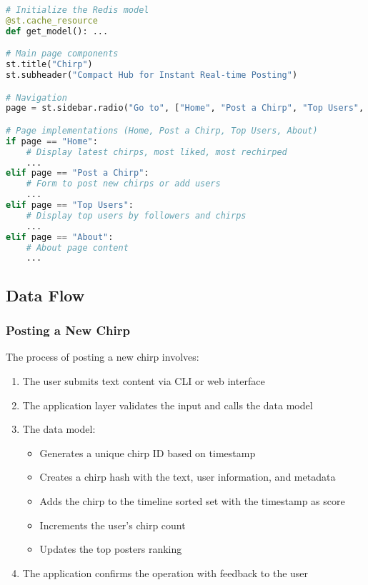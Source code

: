 \documentclass[a4paper,11pt]{article}
\begin{document}
\begin{lstlisting}[language=Python, caption=Streamlit app structure]
# Initialize the Redis model
@st.cache_resource
def get_model(): ...

# Main page components
st.title("Chirp")
st.subheader("Compact Hub for Instant Real-time Posting")

# Navigation
page = st.sidebar.radio("Go to", ["Home", "Post a Chirp", "Top Users", "About"])

# Page implementations (Home, Post a Chirp, Top Users, About)
if page == "Home":
    # Display latest chirps, most liked, most rechirped
    ...
elif page == "Post a Chirp":
    # Form to post new chirps or add users
    ...
elif page == "Top Users":
    # Display top users by followers and chirps
    ...
elif page == "About":
    # About page content
    ...
\end{lstlisting}

\subsection{Data Flow}

\subsubsection{Posting a New Chirp}
The process of posting a new chirp involves:

\begin{enumerate}
    \item The user submits text content via CLI or web interface
    \item The application layer validates the input and calls the data model
    \item The data model:
        \begin{itemize}
            \item Generates a unique chirp ID based on timestamp
            \item Creates a chirp hash with the text, user information, and metadata
            \item Adds the chirp to the timeline sorted set with the timestamp as score
            \item Increments the user's chirp count
            \item Updates the top posters ranking
        \end{itemize}
    \item The application confirms the operation with feedback to the user
\end{enumerate}
\end{document}
